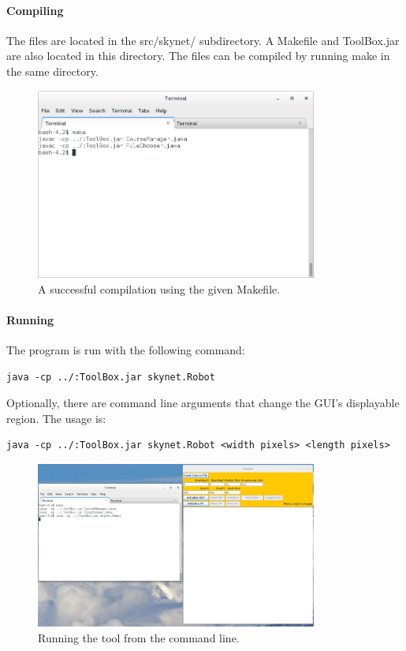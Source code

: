 \documentclass[12pt]{article}
\begin{document}
\paragraph*{Compiling}
The files are located in the src/skynet/ subdirectory. A Makefile and ToolBox.jar are also located in this directory. The files can be compiled by running make in the same directory. 
\begin{figure}
\centering
\includegraphics[width=350]{compile.png}
\caption{A successful compilation using the given Makefile.}
\end{figure}

\paragraph*{Running}
The program is run with the following command:
\begin{lstlisting}
java -cp ../:ToolBox.jar skynet.Robot
\end{lstlisting}
Optionally, there are command line arguments that change the GUI's displayable region. The usage is:
\begin{lstlisting}
java -cp ../:ToolBox.jar skynet.Robot <width pixels> <length pixels>
\end{lstlisting}

\begin{figure}
\centering
\includegraphics[width=350]{running.png}
\caption{Running the tool from the command line.}
\end{figure}
\end{document}
